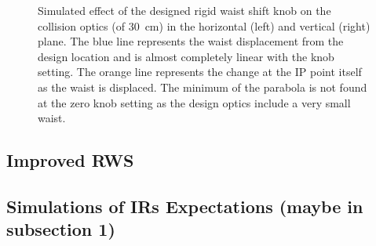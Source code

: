 \begin{figure}[htp]
    \centering
    \hspace{0.3cm}
    \caption{Simulated effect of the designed rigid waist shift knob on the collision optics (\betastar of \qty{30}{\centi\metre}) in the horizontal (left) and vertical (right) plane. The blue line represents the waist displacement from the design location and is almost completely linear with the knob setting. The orange line represents the \betafunction change at the IP point itself as the waist is displaced. The minimum of the parabola is not found at the zero knob setting as the design optics include a very small waist.}
    \label{figure:rigid_waist_shift_knob_effect}
\end{figure}

\subsection{Improved RWS}

\subsection{Simulations of IRs Expectations (maybe in subsection 1)}


